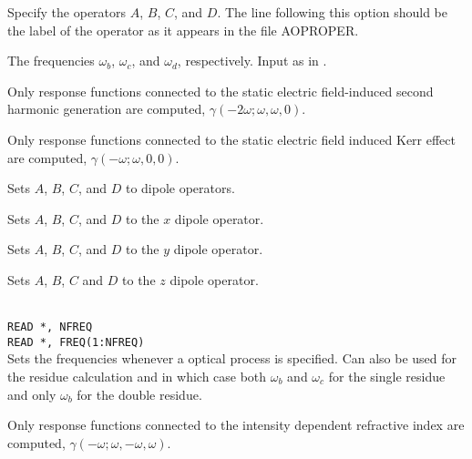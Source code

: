 \begin{description}

\item[, , , ]
Specify the operators $A$, $B$, $C$, and $D$. The line following this
option should be the label of the operator as it appears in the file
AOPROPER.

\item[, , ]
The frequencies
$\omega_b$, $\omega_c$, and $\omega_d$, respectively. Input as in
.

\item{}
Only response functions connected to the static electric field-induced
second harmonic generation are computed,
$\gamma(-2\omega;\omega,\omega,0)$.

\item{}
Only response functions connected to the static electric field induced
Kerr effect are computed,
$\gamma(-\omega;\omega,0,0)$.

\item{}
Sets $A$, $B$, $C$, and $D$ to dipole operators.

\item{}
Sets $A$, $B$, $C$, and $D$ to the $x$ dipole operator.

\item{}
Sets $A$, $B$, $C$, and $D$ to the $y$ dipole operator.

\item{}
Sets $A$, $B$, $C$ and $D$ to the $z$ dipole operator.

\item{}\\
\verb|READ *, NFREQ|\\
\verb|READ *, FREQ(1:NFREQ)|\\
Sets the frequencies whenever a optical process is specified.
Can also be used for the residue calculation and in which case 
both $\omega_b$ and $\omega_c$ for the single residue and only
$\omega_b$ for the double residue.

\item{}
Only response functions connected to the intensity dependent 
refractive index are computed,
$\gamma(-\omega;\omega,-\omega,\omega)$.


\end{description}
